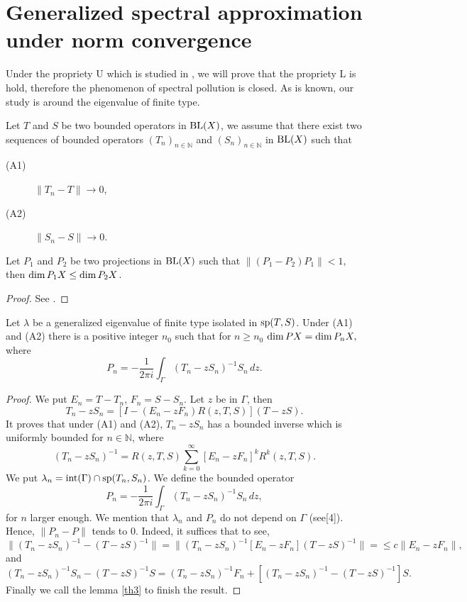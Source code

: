 \documentclass[
11pt,%
tightenlines,%
twoside,%
onecolumn,%
nofloats,%
nobibnotes,%
nofootinbib,%
superscriptaddress,%
noshowpacs,%
centertags]%
{revtex4}
\def\BL{\mathop{\rm BL}\nolimits}
\def\sp{\mathop{\rm sp}\nolimits}
\def\dim{\mathop{\rm dim}\nolimits}
\begin{document}
\section{Generalized spectral approximation under norm convergence}
Under the propriety U which is studied in \cite{bib16},  we will
prove that the propriety L is hold, therefore the phenomenon of
spectral pollution is closed. As is known, our study is around the
eigenvalue of finite type.\par Let $T$ and $S$ be two bounded
operators in $\BL(X)$, we assume that there exist two sequences of
bounded operators $(T_n)_{n\in\mathbb{N}}$ and
$(S_n)_{n\in\mathbb{N}}$ in $\BL(X)$ such that
\begin{description}
  \item[(A1)] $\|T_n-T\|\rightarrow 0$,
  \item[(A2)] $\|S_n-S\|\rightarrow 0$.
\end{description}
\begin{lemma}
\label{th3} Let $P_1$ and $P_2$ be two projections in $\BL(X)$ such that
$
    \|(P_1-P_2)P_1\|<1,
$
then $\dim P_1X\leq\dim P_2X$.
\end{lemma}
\begin{proof} See \cite{bib4}.
\end{proof}
\begin{theorem}Let $\lambda$ be a generalized eigenvalue of finite
type isolated in $\sp(T,S)$. Under (A1) and (A2) there is a positive integer $n_0$ such that for $n\geq n_0$
$
    \dim PX=\dim P_nX,
$
where $$\displaystyle{P_{n}=-\frac{1}{2\pi i}\int_{\Gamma}(T_n-zS_n)^{-1}S_n\,dz}.$$
\end{theorem}
\begin{proof}We put $E_n=T-T_n$, $F_n=S-S_n$. Let $z$ be in $\Gamma$, then
\begin{equation*}
    T_{n}-z S_{n}=[I-(E_n-zF_n)R(z,T,S)](T-zS).
\end{equation*}
It proves that under (A1) and (A2), $T_n-zS_n$ has a bounded inverse
which is uniformly  bounded for $n\in\mathbb{N}$, where
\begin{equation*}
    (T_n-zS_n)^{-1}=R(z,T,S)\sum_{k=0}^{\infty}[E_n-zF_n]^{k}R^{k}(z,T,S).
\end{equation*}
We put $\lambda_n=\mbox{int}(\Gamma)\cap\sp(T_n,S_n)$. We define the bounded operator
\begin{equation*}
    P_{n}=-\frac{1}{2\pi i}\int_{\Gamma}(T_n-zS_n)^{-1}S_n\,dz,
\end{equation*}
for $n$ larger enough. We mention that $\lambda_n$ and $P_n$ do not
depend on $\Gamma$ (see[4]).  Hence, $\|P_n-P\|$ tends to 0. Indeed,
it suffices that to see,
$$
  \|(T_n-zS_n)^{-1}-(T-zS)^{-1}\| = \|(T_n-zS_n)^{-1}[E_n-zF_n](T-zS)^{-1}\| = \leq c\|E_n-zF_n\|,
$$
and
\begin{equation*}
    (T_n-zS_n)^{-1}S_n-(T-zS)^{-1}S=(T_n-zS_n)^{-1}F_n+[(T_n-zS_n)^{-1}-(T-zS)^{-1}]S.
\end{equation*}
Finally we call the lemma \ref{th3} to finish the result.
\end{proof}
\end{document}
